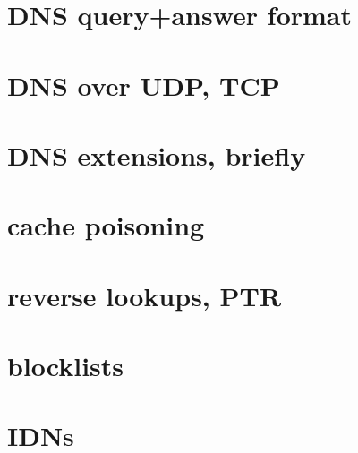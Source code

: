 \section{DNS query+answer format}


\section{DNS over UDP, TCP}


\section{DNS extensions, briefly}




\section{cache poisoning}



\section{reverse lookups, PTR}


\section{blocklists}


\section{IDNs}


